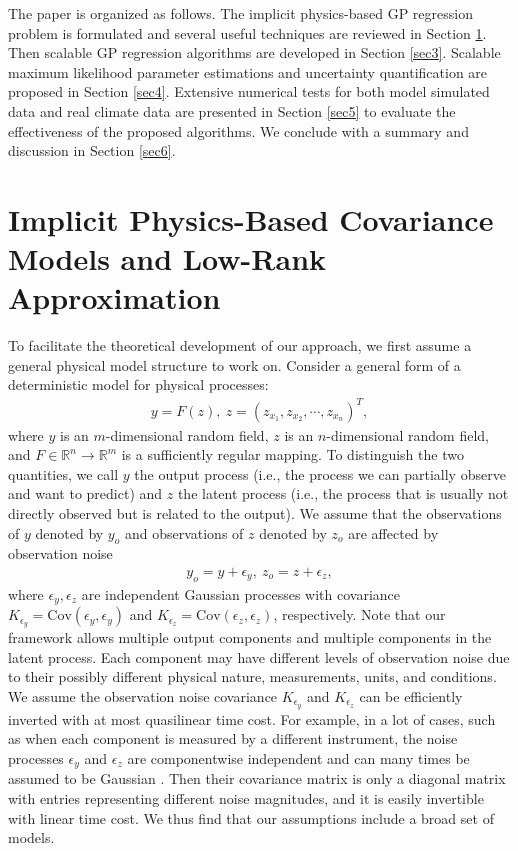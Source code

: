 \documentclass[article,ij4uq]{ij4uq}              %
\begin{document}
\par The paper is organized as follows. The implicit physics-based GP regression problem is formulated and several useful techniques are reviewed in Section \ref{sec2}. Then scalable GP regression algorithms are developed in Section \ref{sec3}. Scalable maximum likelihood parameter estimations and uncertainty quantification are proposed in Section \ref{sec4}. Extensive numerical tests for both model simulated data and real climate data are presented in Section \ref{sec5} to evaluate the effectiveness of the proposed algorithms. We conclude with a summary and  discussion in Section \ref{sec6}.

\section{Implicit Physics-Based Covariance Models and Low-Rank Approximation}\label{sec2}
\par To facilitate the theoretical development of our approach, we first assume a general physical model structure to work on. Consider a general form of a deterministic model for physical processes:
\begin{align}
    y = F(z),\ z=(z_{x_{1}},z_{x_{2}},\cdots,z_{x_{n}})^{T},\label{eq1}
\end{align}
where $y$ is an $m$-dimensional random field, $z$ is an $n$-dimensional random field, and $F\in\mathbb{R}^{n}\rightarrow\mathbb{R}^{m}$ is a sufficiently regular mapping. To distinguish the two quantities, we call $y$ the output process (i.e., the process we can partially observe and want to predict) and $z$ the latent process (i.e., the process that is usually not directly observed but is related to the output). We assume that the observations of $y$ denoted by $y_{o}$ and observations of $z$ denoted by $z_{o}$ are affected by observation noise
\begin{align}
    y_{o}=y+\epsilon_{y},\ z_{o}=z+\epsilon_{z} ,\label{eq2}
\end{align}
where $\epsilon_{y},\epsilon_{z}$ are independent Gaussian processes with covariance $K_{\epsilon_{y}}=\mathrm{Cov}(\epsilon_{y},\epsilon_{y})$ and $K_{\epsilon_{z}}=\mathrm{Cov}(\epsilon_{z},\epsilon_{z})$, respectively. Note that our framework allows multiple output components and multiple components in the latent process. Each component may have different levels of observation noise due to their possibly different physical nature, measurements, units, and conditions. We assume the observation noise covariance $K_{\epsilon_{y}}$ and $K_{\epsilon_{z}}$ can be efficiently inverted with at most quasilinear time cost. For example, in a lot of cases, such as when each component is measured by a different instrument, the noise processes $\epsilon_{y}$ and $\epsilon_{z}$ are componentwise independent and can many times be assumed to be Gaussian \cite{yu2019multidimensional}. Then their covariance matrix is only a diagonal matrix with entries representing different noise magnitudes, and it is easily invertible with linear time cost. We thus find that our assumptions include a broad set of models. 
\end{document}
